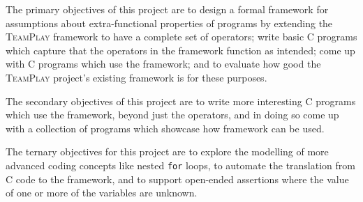 The primary objectives of this project are to design a formal framework for assumptions about extra-functional properties of programs by extending the \textsc{TeamPlay} framework to have a complete set of operators; write basic C programs which capture that the operators in the framework function as intended; come up with C programs which use the framework; and to evaluate how good the \textsc{TeamPlay} project's existing framework is for these purposes.

The secondary objectives of this project are to write more interesting C programs which use the framework, beyond just the operators, and in doing so come up with a collection of programs which showcase how framework can be used.

The ternary objectives for this project are to explore the modelling of more advanced coding concepts like nested \texttt{for} loops, to automate the translation from C code to the framework, and to support open-ended assertions where the value of one or more of the variables are unknown.
